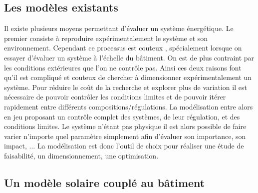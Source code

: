 \subsection{Les modèles existants} %
\label{sub:les_modeles_existants}
Il existe plusieurs moyens permettant d’évaluer un système énergétique. Le premier
consiste à reproduire expérimentalement le système et son environnement. Cependant
ce processus est couteux , spécialement lorsque on essayer d’évaluer un système à l’échelle
du bâtiment. On est de plus contraint par les conditions extérieures que l’on ne contrôle
pas. Ainsi ces deux raisons font qu’il est compliqué et couteux de chercher à dimensionner
expérimentalement un système. Pour réduire le coût de la recherche et explorer plus de
variation il est nécessaire de pouvoir contrôler les conditions limites et de pouvoir
itérer rapidement entre différents compositions/régulations. La modélisation entre alors
en jeu proposant un contrôle complet des systèmes, de leur régulation, et des conditions
limites. Le système n’étant pas physique il est alors possible de faire varier n’importe
quel paramètre simplement afin d’évaluer son importance, son impact, ...
La modélisation est donc l’outil de choix pour réaliser une étude de faisabilité, un
dimensionnement, une optimisation.


\subsection{Un modèle solaire couplé au bâtiment} %
\label{sub:un_modele_solaire_couple_au_bâtiment}


